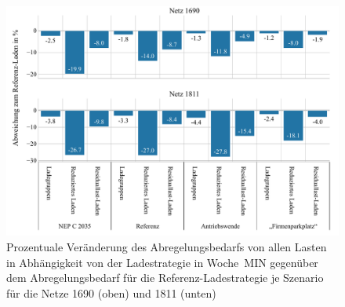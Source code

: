 \begin{figure}[H]
    \centering
    \includegraphics[width=\textwidth]{Bilder/1690_1811_cur_load_grid_week_A}
    \caption{Prozentuale Veränderung des Abregelungsbedarfs von allen Lasten in Abhängigkeit von der Ladestrategie in Woche~MIN gegenüber dem Abregelungsbedarf für die Referenz-Ladestrategie je Szenario für die Netze \num{1690} (oben) und \num{1811} (unten)}\label{fig:1690_1811_cur_load_grid_week_A}
\end{figure}